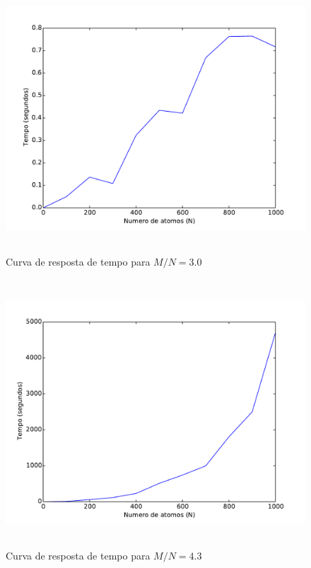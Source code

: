 		\begin{figure}[H]
			\centering
			\includegraphics[height=10cm]{images/max3sat_mn30}
			\caption{Curva de resposta de tempo para $M/N=3.0$}
			\label{fig:max3satmn30}
		\end{figure}
		
		\begin{figure}[H]
			\centering
			\includegraphics[height=10cm]{images/max3sat_mn43}
			\caption{Curva de resposta de tempo para $M/N=4.3$}
			\label{fig:max3satmn43}
		\end{figure}
		
